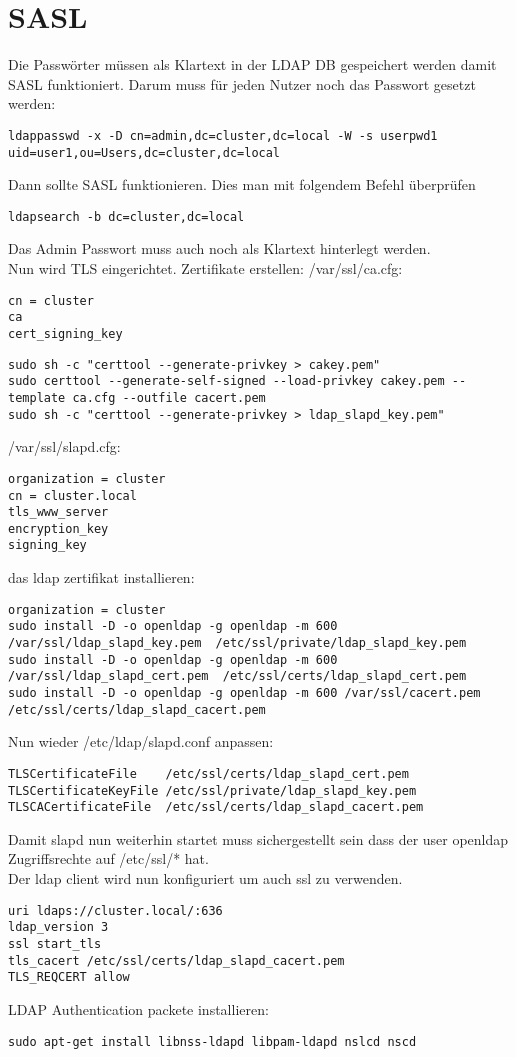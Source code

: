 \section{SASL}
Die Passwörter müssen als Klartext in der LDAP DB gespeichert werden damit SASL funktioniert. Darum muss für jeden Nutzer noch das Passwort gesetzt werden:
\begin{lstlisting}[style=Bash]
ldappasswd -x -D cn=admin,dc=cluster,dc=local -W -s userpwd1 uid=user1,ou=Users,dc=cluster,dc=local 
\end{lstlisting}
Dann sollte SASL funktionieren. Dies man mit folgendem Befehl überprüfen
\begin{lstlisting}[style=Bash]
ldapsearch -b dc=cluster,dc=local
\end{lstlisting}
Das Admin Passwort muss auch noch als Klartext hinterlegt werden.
\\
Nun wird TLS eingerichtet.
Zertifikate erstellen:
/var/ssl/ca.cfg:
\begin{lstlisting}[style=Bash]
cn = cluster
ca
cert_signing_key
\end{lstlisting}
\begin{lstlisting}[style=Bash]
sudo sh -c "certtool --generate-privkey > cakey.pem" 
sudo certtool --generate-self-signed --load-privkey cakey.pem --template ca.cfg --outfile cacert.pem 
sudo sh -c "certtool --generate-privkey > ldap_slapd_key.pem"
\end{lstlisting}
/var/ssl/slapd.cfg:
\begin{lstlisting}[style=Bash]
organization = cluster
cn = cluster.local
tls_www_server
encryption_key
signing_key
\end{lstlisting}
das ldap zertifikat installieren:
\begin{lstlisting}[style=Bash]
organization = cluster
sudo install -D -o openldap -g openldap -m 600 /var/ssl/ldap_slapd_key.pem  /etc/ssl/private/ldap_slapd_key.pem
sudo install -D -o openldap -g openldap -m 600 /var/ssl/ldap_slapd_cert.pem  /etc/ssl/certs/ldap_slapd_cert.pem
sudo install -D -o openldap -g openldap -m 600 /var/ssl/cacert.pem  /etc/ssl/certs/ldap_slapd_cacert.pem 
\end{lstlisting}
Nun wieder /etc/ldap/slapd.conf anpassen:
\begin{lstlisting}[style=Bash]
TLSCertificateFile    /etc/ssl/certs/ldap_slapd_cert.pem
TLSCertificateKeyFile /etc/ssl/private/ldap_slapd_key.pem
TLSCACertificateFile  /etc/ssl/certs/ldap_slapd_cacert.pem
\end{lstlisting}
Damit slapd nun weiterhin startet muss sichergestellt sein dass der user openldap Zugriffsrechte auf /etc/ssl/* hat.
\\
Der ldap client wird nun konfiguriert um auch ssl zu verwenden.
\begin{lstlisting}[style=Bash]
uri ldaps://cluster.local/:636
ldap_version 3
ssl start_tls
tls_cacert /etc/ssl/certs/ldap_slapd_cacert.pem
TLS_REQCERT allow
\end{lstlisting}
LDAP Authentication
packete installieren:
\begin{lstlisting}[style=Bash]
sudo apt-get install libnss-ldapd libpam-ldapd nslcd nscd
\end{lstlisting}

